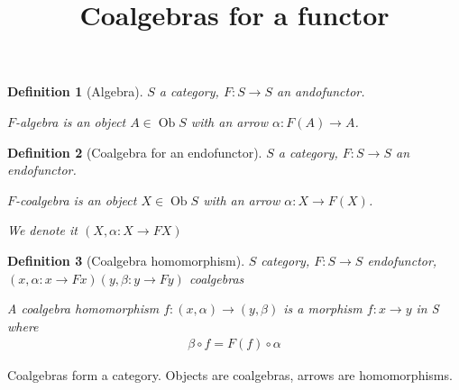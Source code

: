\documentclass{article}
\DeclareMathOperator*{\ob}{Ob}
\newtheorem{definition}{Definition}[section]
\begin{document}
    \title{Coalgebras for a functor}
    \maketitle
    \begin{definition}[Algebra]
        \(S\) a category, \(F:S\to S\) an andofunctor.
        
        \(F\)-algebra is an object \(A\in \ob S\) with an arrow \(\alpha: F(A)\to A\). 
    \end{definition}
    \begin{definition}[Coalgebra for an endofunctor]
        \(S\) a category, \(F:S\to S\) an endofunctor.

        \(F\)-coalgebra is an object \(X\in \ob S\) with an arrow \(\alpha: X\to F(X)\).

        We denote it \((X, \alpha: X\to FX)\)
    \end{definition}
    \begin{definition}[Coalgebra homomorphism]
        \(S\) category, \(F:S\to S\) endofunctor, \((x,\alpha: x\to Fx)(y,\beta:y\to Fy)\) coalgebras

        A coalgebra homomorphism \(f:(x,\alpha)\to (y,\beta)\) is a morphism \(f:x\to y\) in S where
        \begin{align*}
            \beta\circ f = F(f)\circ \alpha 
        \end{align*}
        \begin{center}
        \end{center}
    \end{definition}
    Coalgebras form a category. Objects are coalgebras, arrows are homomorphisms.
\end{document}
